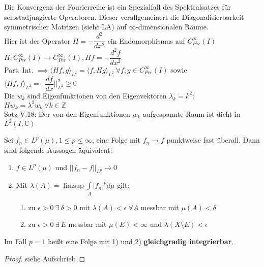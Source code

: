  \begin{remark}
    Die Konvergenz der Fourierreihe ist ein Spezialfall des Spektralsatzes für selbstadjungierte Operatoren. Dieser verallgemeinert die Diagonalisierbarkeit symmetrischer Matrizen (siehe LA) auf $\infty$-dimensionalen Räume.\\
    Hier ist der Operator $H = -\dfrac{d^2}{dx^2}$ ein Endomorphismus auf $C_{Per}^{\infty}(I)$\\
    $H:C_{Per}^{\infty}(I) \to C_{Per}^{\infty}(I), Hf=-\dfrac{d^2f}{dx^2}$\\
    Part. Int. $\implies \langle Hf,g \rangle_{L^2} = \langle f,Hg \rangle_{L^2} \ \forall f,g \in C_{Per}^{\infty}(I)$ sowie $\langle Hf, f \rangle_{L^2} = ||\dfrac{df}{dx}||_{L^2}^2 \geq 0$\\
    Die $w_k$ sind Eigenfunktionen von den Eigenvektoren $\lambda_k = k^2$:\\
    $Hw_k = \lambda^2 w_k \ \forall k \in \mathbb{Z}$\\
    Satz V.18: Der von den Eigenfunktionen $w_k$ aufgespannte Raum ist dicht in $L^2(I, \mathbb{C})$
  \end{remark}

  \begin{theorem}[Vitali]
    Sei $f_n \in L^p(\mu), 1 \leq p \leq \infty$, eine Folge mit $f_n \to f$ punktweise fast überall. Dann sind folgende Aussagen äquivalent:
    \begin{enumerate}[label=\alph*)]
      \item $f \in L^p(\mu)$ und $||f_n - f||_{L^p} \to 0$
      \item Mit $\lambda(A) = \limsup \int\limits_A |f_n|^p d\mu$ gilt:
            \begin{enumerate}[label=\arabic*)]
              \item zu $\epsilon > 0 \ \exists \ \delta > 0$ mit $\lambda(A) < \epsilon \ \forall A$ messbar mit $\mu(A) < \delta$
              \item zu $\epsilon > 0 \ \exists \ E$ messbar mit $\mu(E) < \infty$ und $\lambda(X \setminus E) < \epsilon$ 
            \end{enumerate}
    \end{enumerate}
    Im Fall $p = 1$ heißt eine Folge mit 1) und 2) \textbf{gleichgradig integrierbar}.
  \end{theorem}
  \begin{proof}
    siehe Aufschrieb
  \end{proof}

  